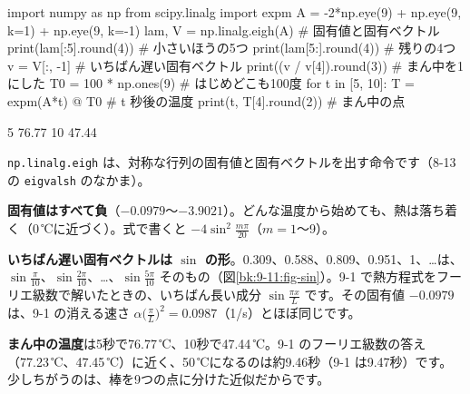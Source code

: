 \begin{bkcode}[Python]
import numpy as np
from scipy.linalg import expm
A = -2*np.eye(9) + np.eye(9, k=1) + np.eye(9, k=-1)
lam, V = np.linalg.eigh(A)      \# 固有値と固有ベクトル
print(lam[:5].round(4))         \# 小さいほうの5つ
print(lam[5:].round(4))         \# 残りの4つ
v = V[:, -1]                    \# いちばん遅い固有ベクトル
print((v / v[4]).round(3))      \# まん中を1にした
T0 = 100 * np.ones(9)           \# はじめどこも100度
for t in [5, 10]:
    T = expm(A*t) @ T0          \# t 秒後の温度
    print(t, T[4].round(2))     \# まん中の点
\end{bkcode}
\begin{bkcodeout}[実行結果]
[-3.9021 -3.618  -3.1756 -2.618  -2.    ]
[-1.382  -0.8244 -0.382  -0.0979]
[0.309 0.588 0.809 0.951 1.    0.951 0.809 0.588 0.309]
5 76.77
10 47.44
\end{bkcodeout}
\texttt{np.linalg.eigh} は、対称な行列の固有値と固有ベクトルを出す命令です（8-13 の \texttt{eigvalsh} のなかま）。

\begin{enumerate}[label={\bkcircled[\bkTT]{\arabic*}}, leftmargin=2.4\zw, itemsep=2pt, topsep=2pt]
\item \textbf{固有値はすべて負}（$-0.0979$〜$-3.9021$）。どんな温度から始めても、熱は落ち着く（0\,℃に近づく）。式で書くと $-4\sin^2\frac{m\pi}{20}$（$m=1$〜9）。
\item \textbf{いちばん遅い固有ベクトルは $\sin$ の形}。0.309、0.588、0.809、0.951、1、…は、$\sin\frac{\pi}{10}$、$\sin\frac{2\pi}{10}$、…、$\sin\frac{5\pi}{10}$ そのもの（図\ref{bk:9-11:fig-sin}）。9-1 で熱方程式をフーリエ級数で解いたときの、いちばん長い成分 $\sin\frac{\pi x}{L}$ です。その固有値 $-0.0979$ は、9-1 の消える速さ $\alpha\bigl(\frac{\pi}{L}\bigr)^2=0.0987$（1/s）とほぼ同じです。
\item \textbf{まん中の温度}は5秒で76.77\,℃、10秒で47.44\,℃。9-1 のフーリエ級数の答え（77.23\,℃、47.45\,℃）に近く、50\,℃になるのは約9.46秒（9-1 は9.47秒）です。少しちがうのは、棒を9つの点に分けた近似だからです。
\end{enumerate}


